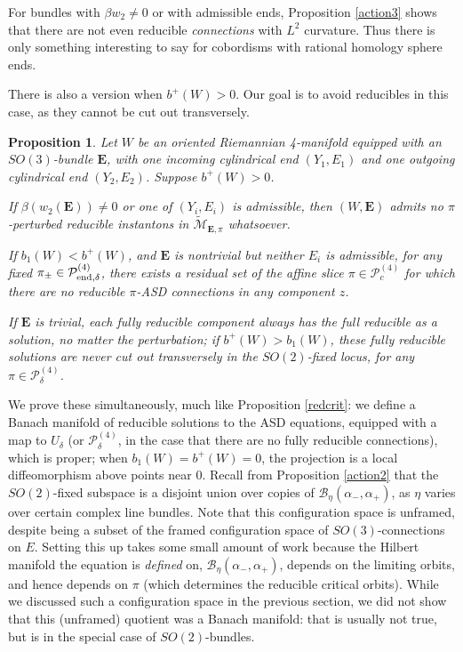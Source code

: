 \documentclass{memo-l}
\newtheorem{proposition}[theorem]{Proposition}
\theoremstyle{definition}
\theoremstyle{remark}
\numberwithin{section}{chapter}
\numberwithin{equation}{chapter}
\begin{document}
For bundles with $\beta w_2 \neq 0$ or with admissible ends, Proposition \ref{action3} shows that there are not even reducible \emph{connections} with $L^2$ curvature. Thus there is only something interesting to say for cobordisms with rational homology sphere ends.

There is also a version when $b^+(W) > 0$. Our goal is to avoid reducibles in this case, as they cannot be cut out transversely.

\begin{proposition}\label{red-bplus-pos}Let $W$ be an oriented Riemannian 4-manifold equipped with an $SO(3)$-bundle $\mathbf{E}$, with one incoming cylindrical end $(Y_1,E_1)$ and one outgoing cylindrical end $(Y_2, E_2)$. Suppose $b^+(W) > 0$.

If $\beta(w_2(\mathbf{E})) \neq 0$ or one of $(Y_i, E_i)$ is admissible, then $(W,\mathbf{E})$ admits no $\pi$-perturbed reducible instantons in $\widetilde{\mathcal M}_{\mathbf{E},\pi}$ whatsoever.

If $b_1(W) < b^+(W)$, and $\mathbf{E}$ is nontrivial but neither $E_i$ is admissible, for any fixed $\pi_\pm \in \mathcal P^{(4)}_{\textup{end},\delta}$, there exists a residual set of the affine slice $\pi \in \mathcal P^{(4)}_{c}$ for which there are no reducible $\pi$-ASD connections in any component $z$.

If $\mathbf{E}$ is trivial, each fully reducible component always has the full reducible as a solution, no matter the perturbation; if $b^+(W) > b_1(W)$, these fully reducible solutions are never cut out transversely in the $SO(2)$-fixed locus, for any $\pi \in \mathcal P^{(4)}_{\delta}$.
\end{proposition}

We prove these simultaneously, much like Proposition \ref{redcrit}: we define a Banach manifold of reducible solutions to the ASD equations, equipped with a map to $U_\delta$ (or $\mathcal P^{(4)}_\delta$, in the case that there are no fully reducible connections), which is proper; when $b_1(W) = b^+(W) = 0$, the projection is a local diffeomorphism above points near $0$. Recall from Proposition \ref{action2} that the $SO(2)$-fixed subspace is a disjoint union over copies of $\mathcal B_{\eta}(\alpha_-, \alpha_+)$, as $\eta$ varies over certain complex line bundles. Note that this configuration space is unframed, despite being a subset of the framed configuration space of $SO(3)$-connections on $E$. Setting this up takes some small amount of work because the Hilbert manifold the equation is \emph{defined} on, $\mathcal{B}_{\eta}(\alpha_-, \alpha_+)$, depends on the limiting orbits, and hence depends on $\pi$ (which determines the reducible critical orbits). While we discussed such a configuration space in the previous section, we did not show that this (unframed) quotient was a Banach manifold: that is usually not true, but is in the special case of $SO(2)$-bundles.
\end{document}
